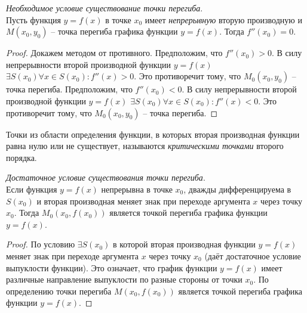 \begin{theorem}
  \textit{Необходимое условие существование точки перегиба}. \\
  Пусть функция $y = f(x)$ в точке $x_0$ имеет \textit{непрерывную} вторую производную и $M(x_0, y_0)$ -- точка перегиба графика функции $y = f(x)$. Тогда $f''(x_0) = 0$.
\end{theorem}
\begin{proof}
  Докажем методом от противного. 
  Предположим, что $f''(x_0) > 0$. В силу непрерывности второй производной функции  $y = f(x)$ $\exists  S(x_0) \forall  x \in S(x_0) : f''(x) > 0$. Это противоречит тому, что $M_0(x_0, y_0)$ -- точка перегиба.
  Предположим, что $f''(x_0) < 0$. В силу непрерывности второй производной функции  $y = f(x)$ $\exists  S(x_0) \forall  x \in S(x_0) : f''(x) < 0$. Это противоречит тому, что $M_0(x_0, y_0)$ -- точка перегиба.
\end{proof}

\begin{definition}
  Точки из области определения функции, в которых вторая производная функции равна нулю или не существует, называются \textit{критическими точками} второго порядка.
\end{definition}

\begin{theorem}
  \textit{Достаточное условие существования точки перегиба}. \\
  Если функция $y = f(x)$ непрерывна в точке $x_0$, дважды дифференцируема в $S(x_0)$ и вторая производная меняет знак при переходе аргумента $x$ через точку $x_0$. Тогда $M_0(x_0, f(x_0))$ является точкой перегиба графика функции $y = f(x)$.
\end{theorem}
\begin{proof}
  По условию $\exists S(x_0)$ в которой вторая производная функции $y = f(x)$ меняет знак при переходе аргумента $x$ через точку $x_0$ (даёт достаточное условие выпуклости функции).
  Это означает, что график функции $y = f(x)$ имеет различные направление выпуклости по разные стороны от точки $x_0$.
  По определению точки перегиба $M(x_0, f(x_0))$ является точкой перегиба графика функции $y = f(x)$.
\end{proof}


